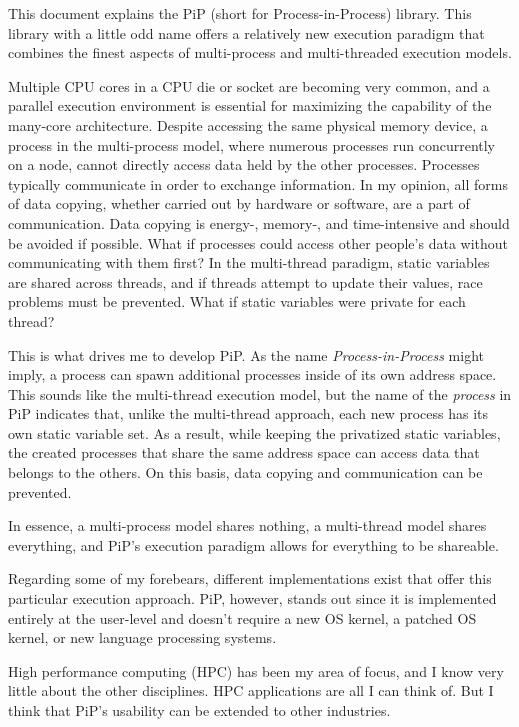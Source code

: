 
This document explains the PiP (short for Process-in-Process)
library. This library with a little odd name offers a relatively new
execution paradigm that combines the finest aspects of multi-process
and multi-threaded execution models.  

Multiple CPU cores in a CPU die or socket are becoming very common,
and a parallel execution environment is essential for maximizing the
capability of the many-core architecture.  
Despite accessing the same physical memory device, a process in the
multi-process model, where numerous processes run concurrently on a
node, cannot directly access data held by the other
processes. Processes typically communicate in order to exchange
information. In my opinion, all forms of data copying, whether carried
out by hardware or software, are a part of communication. Data copying
is energy-, memory-, and time-intensive and should be avoided if
possible. What if processes could access other people's data without
communicating with them first? In the multi-thread paradigm, static
variables are shared across threads, and if threads attempt to update
their values, race problems must be prevented. What if static
variables were private for each thread?

This is what drives me to develop PiP. As the name {\it
Process-in-Process} might imply, a process can spawn additional
processes inside of its own address space. This sounds like the
multi-thread execution model, but the name of the {\it process} in PiP
indicates that, unlike the multi-thread approach, each new process has
its own static variable set. As a result, while keeping the privatized
static variables, the created processes that share the same address
space can access data that belongs to the others. On this basis, data
copying and communication can be prevented.  

In essence, a multi-process model shares nothing, a multi-thread model
shares everything, and PiP's execution paradigm allows for everything
to be shareable.  

Regarding some of my forebears, different implementations exist that
offer this particular execution approach. PiP, however, stands out
since it is implemented entirely at the user-level and doesn't require
a new OS kernel, a patched OS kernel, or new language processing
systems.  

High performance computing (HPC) has been my area of focus, and I know
very little about the other disciplines. HPC applications are all I
can think of. But I think that PiP's usability can be extended to
other industries.
